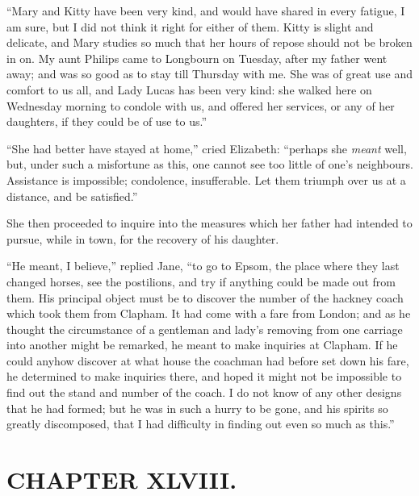 ``Mary and Kitty have been very kind, and would have shared in every fatigue, I am sure, but I did not think it right for either of them. Kitty is slight and delicate, and Mary studies so much that her hours of repose should not be broken in on. My aunt Philips came to Longbourn on Tuesday, after my father went away; and was so good as to stay till Thursday with me. She was of great use and comfort to us all, and Lady Lucas has been very kind: she walked here on Wednesday morning to condole with us, and offered her services, or any of her daughters, if they could be of use to us.''

``She had better have stayed at home,'' cried Elizabeth: ``perhaps she \textit{meant} well, but, under such a misfortune as this, one cannot see too little of one's neighbours. Assistance is impossible; condolence, insufferable. Let them triumph over us at a distance, and be satisfied.''

She then proceeded to inquire into the measures which her father had intended to pursue, while in town, for the recovery of his daughter.

``He meant, I believe,'' replied Jane, ``to go to Epsom, the place where they last changed horses, see the postilions, and try if anything could be made out from them. His principal object must be to discover the number of the hackney coach which took them from Clapham. It had come with a fare from London; and as he thought the circumstance of a gentleman and lady's removing from one carriage into another might be remarked, he meant to make inquiries at Clapham. If he could anyhow discover at what house the coachman had before set down his fare, he determined to make inquiries there, and hoped it might not be impossible to find out the stand and number of the coach. I do not know of any other designs that he had formed; but he was in such a hurry to be gone, and his spirits so greatly discomposed, that I had difficulty in finding out even so much as this.''



\chapter{CHAPTER XLVIII.}

